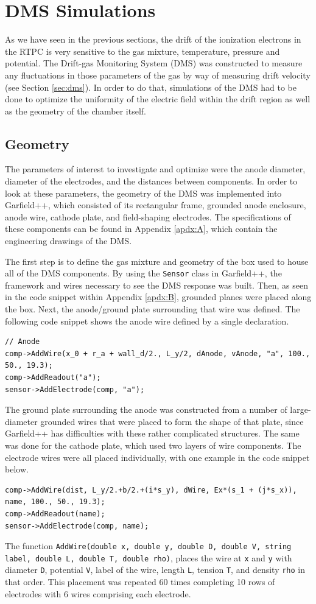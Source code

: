 \section{DMS Simulations} 
\label{sec:dms_sims}
As we have seen in the previous sections, the drift of the ionization electrons in the RTPC is very sensitive to the gas mixture, temperature, pressure and potential. The Drift-gas Monitoring System (DMS) was constructed to measure any fluctuations in those parameters of the gas by way of measuring drift velocity (see Section \ref{sec:dms}). In order to do that, simulations of the DMS had to be done to optimize the uniformity of the electric field within the drift region as well as the geometry of the chamber itself.
\subsection{Geometry} 
The parameters of interest to investigate and optimize were the anode diameter, diameter of the electrodes, and the distances between components. In order to look at these parameters, the geometry of the DMS was implemented into Garfield++, which consisted of its rectangular frame, grounded anode enclosure, anode wire, cathode plate, and field-shaping electrodes. The specifications of these components can be found in Appendix \ref{apdx:A}, which contain the engineering drawings of the DMS.

The first step is to define the gas mixture and geometry of the box used to house all of the DMS components. By using the  \lstinline|Sensor| class in Garfield++, the framework and wires necessary to see the DMS response was built. Then, as seen in the code snippet within Appendix \ref{apdx:B}, grounded planes were placed along the box. Next, the anode/ground plate surrounding that wire was defined. The following code snippet shows the anode wire defined by a single declaration.
\begin{lstlisting} 
// Anode
comp->AddWire(x_0 + r_a + wall_d/2., L_y/2, dAnode, vAnode, "a", 100., 50., 19.3);
comp->AddReadout("a");
sensor->AddElectrode(comp, "a");
\end{lstlisting}
The ground plate surrounding the anode was constructed from a number of large-diameter grounded wires that were placed to form the shape of that plate, since Garfield++ has difficulties with these rather complicated structures. The same was done for the cathode plate, which used two layers of wire components. The electrode wires were all placed individually, with one example in the code snippet below.
\begin{lstlisting}
comp->AddWire(dist, L_y/2.+b/2.+(i*s_y), dWire, Ex*(s_1 + (j*s_x)), name, 100., 50., 19.3);
comp->AddReadout(name);
sensor->AddElectrode(comp, name);
\end{lstlisting}
The function \lstinline|AddWire(double x, double y, double D, double V, string label, double L, double T, double rho)|, places the wire at \lstinline|x| and \lstinline|y| with diameter \lstinline|D|, potential \lstinline|V|, label of the wire, length \lstinline|L|, tension \lstinline|T|, and density \lstinline|rho| in that order. This placement was repeated 60 times completing 10 rows of electrodes with 6 wires comprising each electrode.

